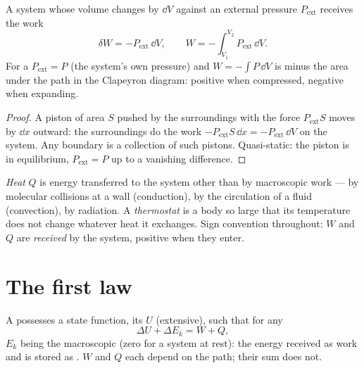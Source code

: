\begin{proposition}\label{prop:b1:first-law:work}
A system whose volume changes by $\dd V$ against an external pressure
$P_{\mathrm{ext}}$ receives the work
\[
\delta W = -P_{\mathrm{ext}}\,\dd V, \qquad
W = -\int_{V_1}^{V_2}P_{\mathrm{ext}}\,\dd V .
\]
For a  $P_{\mathrm{ext}} = P$ (the system's own
pressure) and $W = -\int P\,\dd V$ is minus the area under the path in the
Clapeyron diagram: positive when compressed, negative when expanding.
\end{proposition}

\begin{proof}
A piston of area $S$ pushed by the surroundings with the force
$P_{\mathrm{ext}}S$ moves by $\dd x$ outward: the surroundings do the work
$-P_{\mathrm{ext}}S\,\dd x = -P_{\mathrm{ext}}\,\dd V$ on the system. Any
boundary is a collection of such pistons. Quasi-static: the piston is in
equilibrium, $P_{\mathrm{ext}} = P$ up to a vanishing difference.
\end{proof}

\begin{definition}[Heat]\label{def:b1:first-law:heat}
\emph{Heat} $Q$ is energy transferred to the system other than by
macroscopic work --- by molecular collisions at a wall (conduction),
by the circulation of a fluid (convection), by radiation. A
\emph{thermostat} is a body so large that its temperature does not change
whatever heat it exchanges. Sign convention throughout: $W$ and $Q$ are
\emph{received} by the system, positive when they enter.
\end{definition}

\section{The first law}

\begin{theorem}\label{thm:b1:first-law:firstlaw}
A  possesses a state function, its \emph{}
$U$ (extensive), such that for any 
\[
\Delta U + \Delta E_{k} = W + Q ,
\]
$E_k$ being the macroscopic  (zero for a system at rest):
the energy received as work and  is stored as . $W$
and $Q$ each depend on the path; their sum does not.
\end{theorem}
\admitted


